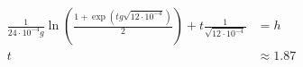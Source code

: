 \begin{align*}
    \frac{1}{24\cdot 10^{-4}g}\ln\left(\frac{1 + \exp\left(tg\sqrt {12\cdot 10^{-4}}\right)}{2}\right) + t\frac{1}{\sqrt{12 \cdot 10^{-4}}}                                                                      & = h          \\
    t                                                                                                                                                                                                            & \approx 1.87
\end{align*}


